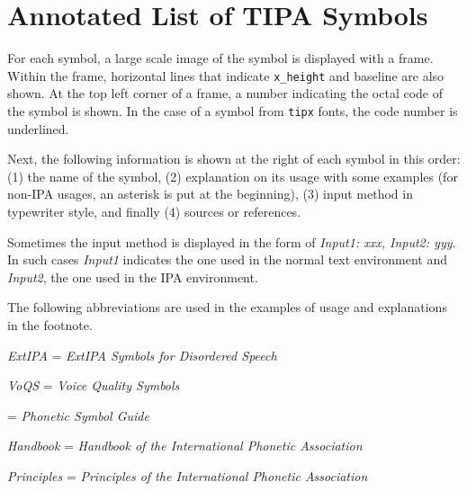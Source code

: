 %
%
%

\appendix
{}

\begingroup
\raggedbottom

\chapter{Annotated List of TIPA Symbols}

For each symbol, a large scale image of the symbol is displayed with a
frame. Within the frame, horizontal lines that indicate
\verb|x_height| and baseline are also shown. At the top left corner of
a frame, a number indicating the octal code
of the symbol is shown. In the case of a symbol from
\texttt{tipx} fonts, the code number is underlined.

Next, the following information is shown at the right of each symbol
in this order: (1) the name of the symbol, (2) explanation on its
usage with some examples (for non-IPA usages, an asterisk is put at the
beginning), (3) input method in typewriter style, and finally (4)
sources or references.

Sometimes the input method is displayed in the form of \textit{Input1:
  xxx, Input2: yyy\/}. In such cases \textit{Input1} indicates the one
used in the normal text environment and \textit{Input2}, the one used
in the IPA environment.

The following abbreviations are used in the examples of usage and
explanations in the footnote.

\vspace{1cm}

\emph{ExtIPA} = \emph{ExtIPA Symbols for Disordered Speech}

\emph{VoQS} = \emph{Voice Quality Symbols}

\PSG{} = \emph{Phonetic Symbol Guide} \citep{PSG:II}

\emph{Handbook} = \emph{Handbook of the International Phonetic
  Association} \citep{Handbook}

\emph{Principles} = \emph{Principles of the International Phonetic
  Association} \citep{Principles}

